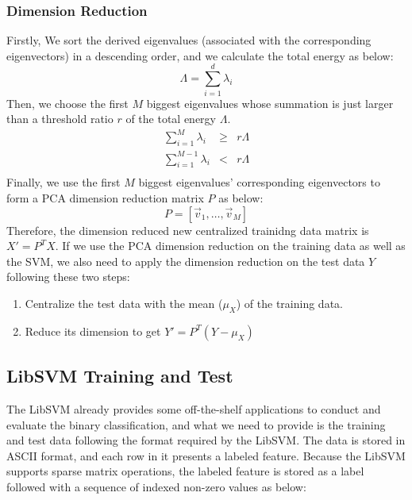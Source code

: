 \documentclass[10pt,twocolumn,letterpaper]{article}
\begin{document}
\subsubsection{Dimension Reduction}

Firstly, We sort the derived eigenvalues (associated with the corresponding eigenvectors) in a descending order, and we calculate the total energy as below:
\begin{equation}
\Lambda=\sum_{i=1}^{d}{\lambda_i}
\end{equation}
Then, we choose the first $M$ biggest eigenvalues whose summation is just larger than a threshold ratio $r$ of the total energy $\Lambda$.
\begin{equation}
\begin{array}{rcl}
\sum_{i=1}^{M}{\lambda_i} & \geq & r\Lambda \\
\sum_{i=1}^{M-1}{\lambda_i} & < & r\Lambda \\
\end{array}
\end{equation}
Finally, we use the first $M$ biggest eigenvalues' corresponding eigenvectors to form a PCA dimension reduction matrix $P$ as below:
\begin{equation}
P=[\vec{v}_1,\dots,\vec{v}_M]
\end{equation}
Therefore, the dimension reduced new centralized trainidng data matrix is $X'=P^TX$. If we use the PCA dimension reduction on the training data as well as the SVM, we also need to apply the dimension reduction on the test data $Y$ following these two steps:
\begin{enumerate}
	\item Centralize the test data with the mean ($\mu_X$) of the training data.
	\item Reduce its dimension to get $Y'=P^T(Y-\mu_X)$
\end{enumerate}

\subsection{LibSVM Training and Test}

The LibSVM already provides some off-the-shelf applications to conduct and evaluate the binary classification, and what we need to provide is the training and test data following the format required by the LibSVM. The data is stored in ASCII format, and each row in it presents a labeled feature. Because the LibSVM supports sparse matrix operations, the labeled feature is stored as a label followed with a sequence of indexed non-zero values as below:
\end{document}
